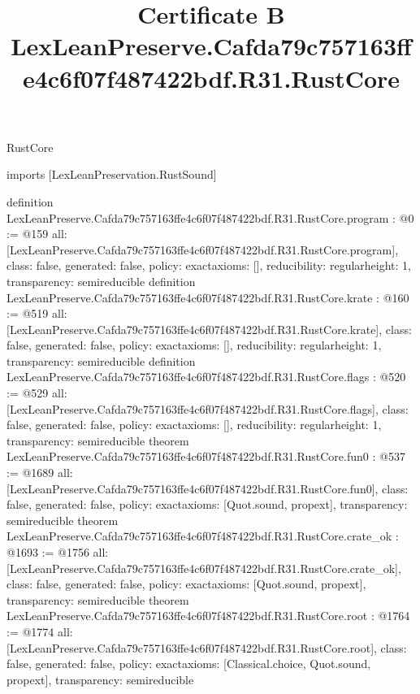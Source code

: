 \begin{lexlean}{RustCore}
\title{Certificate B LexLeanPreserve.Cafda79c757163ffe4c6f07f487422bdf.R31.RustCore}
\begin{coremodule}
imports [LexLeanPreservation.RustSound]

definition LexLeanPreserve.Cafda79c757163ffe4c6f07f487422bdf.R31.RustCore.program : @0 := @159 {
  all: [LexLeanPreserve.Cafda79c757163ffe4c6f07f487422bdf.R31.RustCore.program],
  class: false,
  generated: false,
  policy: exact{axioms: []},
  reducibility: regular{height: 1},
  transparency: semireducible
}
definition LexLeanPreserve.Cafda79c757163ffe4c6f07f487422bdf.R31.RustCore.krate : @160 := @519 {
  all: [LexLeanPreserve.Cafda79c757163ffe4c6f07f487422bdf.R31.RustCore.krate],
  class: false,
  generated: false,
  policy: exact{axioms: []},
  reducibility: regular{height: 1},
  transparency: semireducible
}
definition LexLeanPreserve.Cafda79c757163ffe4c6f07f487422bdf.R31.RustCore.flags : @520 := @529 {
  all: [LexLeanPreserve.Cafda79c757163ffe4c6f07f487422bdf.R31.RustCore.flags],
  class: false,
  generated: false,
  policy: exact{axioms: []},
  reducibility: regular{height: 1},
  transparency: semireducible
}
theorem LexLeanPreserve.Cafda79c757163ffe4c6f07f487422bdf.R31.RustCore.fun0 : @537 := @1689 {
  all: [LexLeanPreserve.Cafda79c757163ffe4c6f07f487422bdf.R31.RustCore.fun0],
  class: false,
  generated: false,
  policy: exact{axioms: [Quot.sound, propext]},
  transparency: semireducible
}
theorem LexLeanPreserve.Cafda79c757163ffe4c6f07f487422bdf.R31.RustCore.crate_ok : @1693 := @1756 {
  all: [LexLeanPreserve.Cafda79c757163ffe4c6f07f487422bdf.R31.RustCore.crate_ok],
  class: false,
  generated: false,
  policy: exact{axioms: [Quot.sound, propext]},
  transparency: semireducible
}
theorem LexLeanPreserve.Cafda79c757163ffe4c6f07f487422bdf.R31.RustCore.root : @1764 := @1774 {
  all: [LexLeanPreserve.Cafda79c757163ffe4c6f07f487422bdf.R31.RustCore.root],
  class: false,
  generated: false,
  policy: exact{axioms: [Classical.choice, Quot.sound, propext]},
  transparency: semireducible
}


\end{coremodule}
\end{lexlean}
